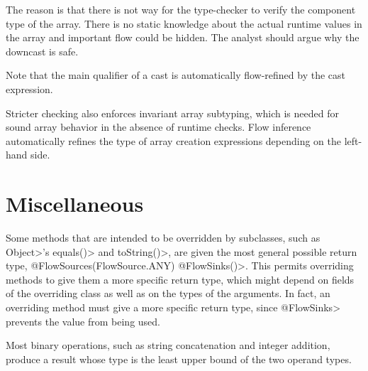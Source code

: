 The reason is that there is not way for the type-checker to verify
 the component type of the array. There is no static knowledge about the actual
runtime values in the array and important flow could be hidden.
The analyst should argue why the downcast is safe.

Note that the main qualifier of a cast is automatically flow-refined
by the cast expression.


\medskip

Stricter checking also enforces invariant array subtyping, which is
needed for sound array behavior in the absence of runtime checks.
Flow inference automatically refines the type of array creation
expressions depending on the left-hand side.

\section{Miscellaneous\label{sec:miscellaneous}}

Some methods that are intended to be overridden by subclasses, such as 
\<Object>'s \<equals()> and \<toString()>, are given the most general
possible return type, \<@FlowSources(FlowSource.ANY) @FlowSinks({})>.
This permits overriding methods to give them a more specific return type, which
might depend on fields of the overriding class as well as on the types of
the arguments.  In fact, an overriding method must give a more specific
return type, since \<@FlowSinks> prevents the value from being used.

Most binary operations, such as string concatenation and integer addition,
produce a result whose type is the least upper bound of the two operand types.





